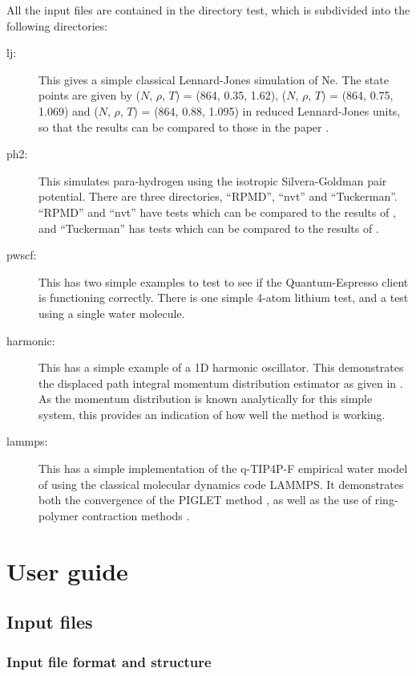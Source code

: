 \documentclass[11pt,english,fleqn]{report}
\begin{document}
All the input files are contained in the directory test, which is
subdivided into the following directories:
\begin{description}
\item [{lj:}] This gives a simple classical Lennard-Jones simulation of
Ne. The state points are given by (\(N\), \(\rho\), \(T\)) = (864, 0.35,
1.62), (\(N\), \(\rho\), \(T\)) = (864, 0.75, 1.069) and (\(N\), \(\rho\), \(T\))
= (864, 0.88, 1.095) in reduced Lennard-Jones units, so that the results
can be compared to those in the paper \cite{lverlet67pr}.
\item [{ph2:}] This simulates para-hydrogen using the isotropic Silvera-Goldman
pair potential. There are three directories, {}``RPMD'', {}``nvt''
and {}``Tuckerman''. {}``RPMD'' and {}``nvt'' have tests which
can be compared to the results of \cite{mill-mano05jcp}, and {}``Tuckerman''
has tests which can be compared to the results of \cite{mart+99jcp}.
\item [{pwscf:}] This has two simple examples to test to see if the Quantum-Espresso
client is functioning correctly. There is one simple 4-atom lithium
test, and a test using a single water molecule.
\item [{harmonic:}] This has a simple example of a 1D harmonic oscillator.
This demonstrates the displaced path integral momentum distribution
estimator as given in \cite{linlin+10prl}. As the momentum distribution
is known analytically for this simple system, this provides an indication
of how well the method is working.
\item [{lammps:}] This has a simple implementation of the q-TIP4P-F empirical
water model of \cite{habe+09jcp} using the classical molecular dynamics
code LAMMPS. It demonstrates both the convergence of the PIGLET method
\cite{ceri-mano12prl}, as well as the use of ring-polymer contraction
methods \cite{mark-mano08jcp}.
\end{description}

\chapter{User guide}

\label{user}


\section{Input files}


\subsection{Input file format and structure}
\end{document}
